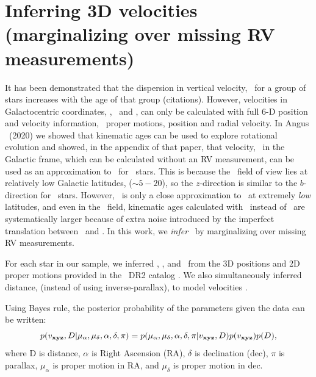 \section{Inferring 3D velocities (marginalizing over missing RV
measurements)}
\label{sec:velocities}

It has been demonstrated that the dispersion in vertical velocity, \vz\, for a
group of stars increases with the age of that group (citations).
However, velocities in Galactocentric coordinates, \vx, \vy\ and \vz, can only
be calculated with full 6-D position and velocity information, \ie\ proper
motions, position and radial velocity.
In Angus \etal\ (2020) we showed that kinematic ages can be used to explore
rotational evolution and showed, in the appendix of that paper, that velocity,
\vb\ in the Galactic frame, which can be calculated without an RV measurement,
can be used as an approximation to \vz\ for \kepler\ stars.
This is because the \kepler\ field of view lies at relatively low Galactic
latitudes, ($\sim 5-20$\degrees), so the $z$-direction is similar to the
$b$-direction for \kepler\ stars.
However, \vb\ is only a close approximation to \vz\ at extremely {\it low}
latitudes, and even in the \kepler\ field, kinematic ages calculated with \vb\
instead of \vz\ are systematically larger because of extra noise introduced by
the imperfect translation between \vb\ and \vz .
In this work, we {\it infer} \vz\ by marginalizing over missing RV
measurements.

For each star in our sample, we inferred \vx, \vy, and \vz\ from the 3D
positions and 2D proper motions provided in the \gaia\ DR2 catalog
\citep{brown2011}.
We also simultaneously inferred distance, (instead of using inverse-parallax),
to model velocities \citep[see \eg][]{bailer-jones2015, bailer-jones2018}.

Using Bayes rule, the posterior probability of the parameters given the data
can be written:
\begin{equation}
p(v_{\bf xyz}, D | \mu_{\alpha}, \mu_{\delta}, \alpha, \delta, \pi) =
    p(\mu_{\alpha}, \mu_{\delta}, \alpha, \delta, \pi | v_{\bf xyz}, D)
    p(v_{\bf xyz}) p(D),
\end{equation}
where D is distance, $\alpha$ is Right Ascension (RA), $\delta$ is declination
(dec), $\pi$ is parallax, $\mu_\alpha$ is proper motion in RA, and
$\mu_\delta$ is proper motion in dec.

